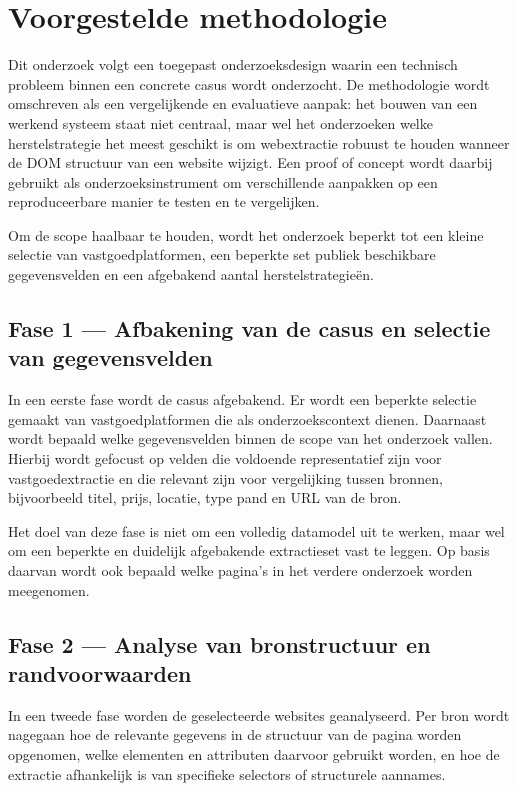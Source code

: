 \section{Voorgestelde methodologie}
\label{sec:methodologie}

Dit onderzoek volgt een toegepast onderzoeksdesign waarin een technisch probleem binnen een concrete casus wordt onderzocht. De methodologie wordt omschreven als een vergelijkende en evaluatieve aanpak: het bouwen van een werkend systeem staat niet centraal, maar wel het onderzoeken welke herstelstrategie het meest geschikt is om webextractie robuust te houden wanneer de DOM structuur van een website wijzigt. Een proof of concept wordt daarbij gebruikt als onderzoeksinstrument om verschillende aanpakken op een reproduceerbare manier te testen en te vergelijken.

Om de scope haalbaar te houden, wordt het onderzoek beperkt tot een kleine selectie van vastgoedplatformen, een beperkte set publiek beschikbare gegevensvelden en een afgebakend aantal herstelstrategieën.

\subsection{Fase 1 --- Afbakening van de casus en selectie van gegevensvelden}
\label{subsec:meth-fase1}

In een eerste fase wordt de casus afgebakend. Er wordt een beperkte selectie gemaakt van vastgoedplatformen die als onderzoekscontext dienen. Daarnaast wordt bepaald welke gegevensvelden binnen de scope van het onderzoek vallen. Hierbij wordt gefocust op velden die voldoende representatief zijn voor vastgoedextractie en die relevant zijn voor vergelijking tussen bronnen, bijvoorbeeld titel, prijs, locatie, type pand en URL van de bron.

Het doel van deze fase is niet om een volledig datamodel uit te werken, maar wel om een beperkte en duidelijk afgebakende extractieset vast te leggen. Op basis daarvan wordt ook bepaald welke pagina's in het verdere onderzoek worden meegenomen.

\subsection{Fase 2 --- Analyse van bronstructuur en randvoorwaarden}
\label{subsec:meth-fase2}

In een tweede fase worden de geselecteerde websites geanalyseerd. Per bron wordt nagegaan hoe de relevante gegevens in de structuur van de pagina worden opgenomen, welke elementen en attributen daarvoor gebruikt worden, en hoe de extractie afhankelijk is van specifieke selectors of structurele aannames.


